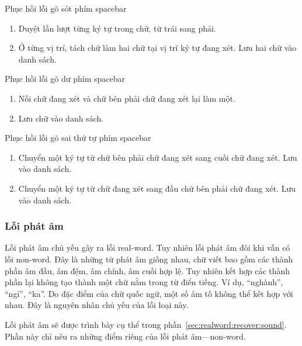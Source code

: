 \documentclass[a4paper,oneside,14pt]{extbook} %
\begin{document}
\begin{algo}\caption{Phục hồi lỗi gõ sót phím spacebar}
  \begin{enumerate}
  \item Duyệt lần lượt từng ký tự trong chữ, từ trái sang phải.
  \item Ở từng vị trí, tách chữ làm hai chữ tại vị trí ký tự đang
    xét. Lưu hai chữ vào danh sách.
  \end{enumerate}
\end{algo}

\begin{algo}\caption{Phục hồi lỗi gõ dư phím spacebar}
  \begin{enumerate}
  \item Nối chữ đang xét và chữ bên phải chữ đang xét lại làm một. 
  \item Lưu chữ vào danh sách.
  \end{enumerate}
\end{algo}

\begin{algo}\caption{Phục hồi lỗi gõ sai thứ tự phím spacebar}
  \begin{enumerate}
  \item Chuyển một ký tự từ chữ bên phải chữ đang xét sang cuối chữ đang
    xét. Lưu vào danh sách.
  \item Chuyển một ký tự từ chữ đang xét sang đầu chữ bên phải chữ đang
    xét. Lưu vào danh sách.
  \end{enumerate}
\end{algo}

\subsubsection{Lỗi phát âm}

Lỗi phát âm chủ yếu gây ra lỗi real-word. Tuy nhiên lỗi phát âm đôi
khi vẫn có lỗi non-word. Đây là những từ phát âm giống nhau, chữ viết
bao gồm các thành phần âm đầu, âm đệm, âm chính, âm cuối hợp lệ. Tuy
nhiên kết hợp các thành phần lại không tạo thành một chữ nằm trong từ
điển tiếng. Ví dụ, ``nghành'', ``ngỉ'', ``ka''. Do đặc điểm của chữ
quốc ngữ, một số âm tố không thể kết hợp với nhau. Đây là nguyên nhân
chủ yếu của lỗi loại này.

Lỗi phát âm sẽ được trình bày cụ thể trong
phần~\ref{sec:realword:recover:sound}. Phần này chỉ nêu ra những điểm
riêng của lỗi phát âm---non-word.
\end{document}
